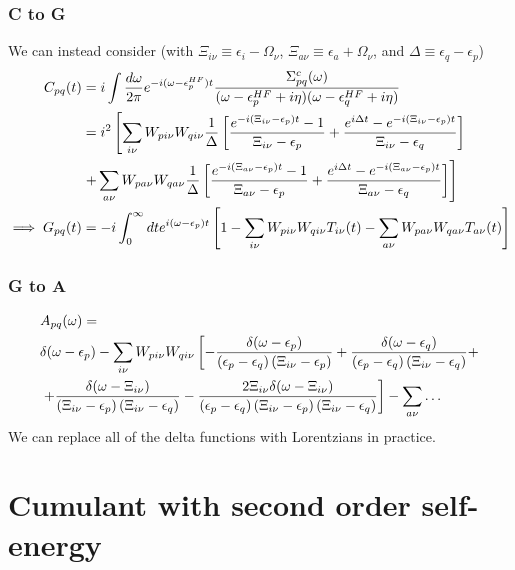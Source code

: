 \begin{frame}
    \frametitle{C to G}
\color{orange}
We can instead consider (with $\Xi_{i\nu} \equiv \epsilon_i - \Omega_\nu$, $\Xi_{a\nu} \equiv \epsilon_a + \Omega_\nu$, and $\Delta \equiv \epsilon_q - \epsilon_p$)
\begin{align}
    C_{pq}(t) &= i \int \frac{d\omega}{2\pi} e^{-i(\omega-\epsilon_p^{HF})t} \frac{\Sigma_{pq}^c(\omega)}{(\omega - \epsilon_p^{HF} + i\eta)(\omega - \epsilon_q^{HF} + i\eta)} \\
&=  i^2\left[ \sum_{i\nu} W_{p i \nu} W_{q i \nu} \frac{1}{\Delta}\left[\frac{e^{-i\left(\Xi_{i\nu} - \epsilon_p\right) t}-1 }{\Xi_{i\nu}-\epsilon_p} + \frac{e^{i\Delta t} - e^{-i\left(\Xi_{i\nu} - \epsilon_p\right) t}}{\Xi_{i\nu} - \epsilon_q}\right] \right.\\
& \left. + \sum_{a\nu} W_{p a \nu} W_{q a \nu} 
\frac{1}{\Delta}\left[{\frac{e^{-i\left(\Xi_{a\nu} - \epsilon_p\right) t}-1 }{\Xi_{a\nu}-\epsilon_p} + \frac{e^{i\Delta t} - e^{-i\left(\Xi_{a\nu} - \epsilon_p\right) t}}{\Xi_{a\nu} - \epsilon_q}}\right] \right] \notag \\
\implies G_{pq}(t) &= -i \int_0^\infty dt e^{i(\omega - \epsilon_p) t} \left[1- \sum_{i\nu} W_{p i \nu} W_{q i \nu} T_{i\nu}(t) - \sum_{a\nu} W_{p a \nu} W_{q a \nu} T_{a\nu}(t) \right] 
\end{align}

\end{frame}
\begin{frame}
    \frametitle{G to A}
\color{orange}
\begin{align}
    &A_{pq}(\omega) = \\ & \delta(\omega - \epsilon_p) - \sum_{i\nu} W_{p i \nu} W_{q i \nu} \left[-\frac{\delta(\omega - \epsilon_p)}{\left(\epsilon_p-\epsilon_q\right)\left(\Xi_{i\nu}-\epsilon_p\right)} + \frac{\delta(\omega - \epsilon_q)}{\left(\epsilon_p-\epsilon_q\right)\left(\Xi_{i\nu}-\epsilon_q\right)} + \right. \\
 & \left. + \frac{\delta(\omega - \Xi_{i\nu})}{\left(\Xi_{i\nu}-\epsilon_p\right)\left(\Xi_{i\nu}-\epsilon_q\right)} - \frac{2\Xi_{i\nu}\delta(\omega - \Xi_{i\nu})}{\left(\epsilon_p-\epsilon_q\right)\left(\Xi_{i\nu}-\epsilon_p\right)\left(\Xi_{i\nu}-\epsilon_q\right)}\right] - \sum_{a\nu} \ldots \notag
\end{align}
We can replace all of the delta functions with Lorentzians in practice.

\end{frame}

\section{Cumulant with second order self-energy}



